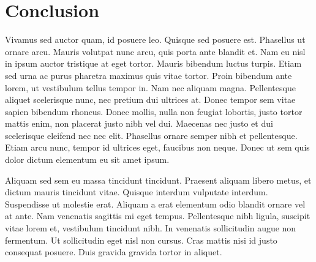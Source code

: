 \section*{Conclusion}

Vivamus sed auctor quam, id posuere leo. Quisque sed posuere est. Phasellus ut ornare arcu. Mauris volutpat nunc arcu, quis porta ante blandit et. Nam eu nisl in ipsum auctor tristique at eget tortor. Mauris bibendum luctus turpis. Etiam sed urna ac purus pharetra maximus quis vitae tortor. Proin bibendum ante lorem, ut vestibulum tellus tempor in. Nam nec aliquam magna. Pellentesque aliquet scelerisque nunc, nec pretium dui ultrices at. Donec tempor sem vitae sapien bibendum rhoncus. Donec mollis, nulla non feugiat lobortis, justo tortor mattis enim, non placerat justo nibh vel dui. Maecenas nec justo et dui scelerisque eleifend nec nec elit. Phasellus ornare semper nibh et pellentesque. Etiam arcu nunc, tempor id ultrices eget, faucibus non neque. Donec ut sem quis dolor dictum elementum eu sit amet ipsum.

Aliquam sed sem eu massa tincidunt tincidunt. Praesent aliquam libero metus, et dictum mauris tincidunt vitae. Quisque interdum vulputate interdum. Suspendisse ut molestie erat. Aliquam a erat elementum odio blandit ornare vel at ante. Nam venenatis sagittis mi eget tempus. Pellentesque nibh ligula, suscipit vitae lorem et, vestibulum tincidunt nibh. In venenatis sollicitudin augue non fermentum. Ut sollicitudin eget nisl non cursus. Cras mattis nisi id justo consequat posuere. Duis gravida gravida tortor in aliquet.

\clearpage